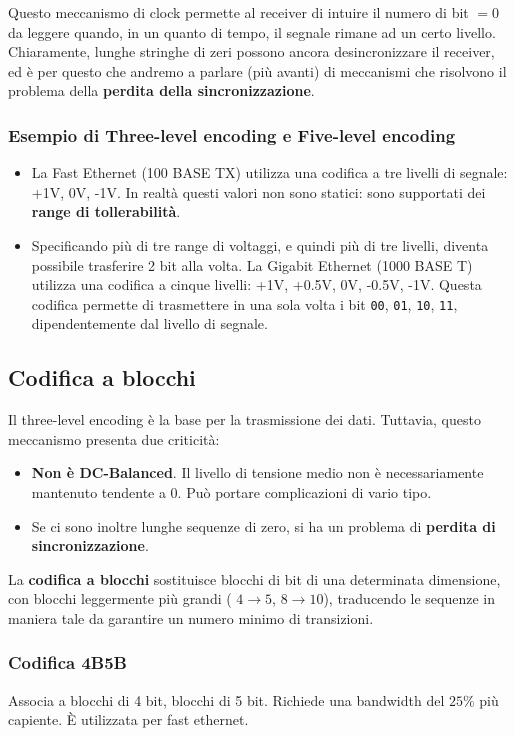Questo meccanismo di clock permette al receiver di intuire il numero di bit $=0$ da leggere quando, in un quanto di tempo, il segnale rimane ad un certo livello. Chiaramente, lunghe stringhe di zeri possono ancora desincronizzare il receiver, ed è per questo che andremo a parlare (più avanti) di meccanismi che risolvono il problema della \textbf{perdita della sincronizzazione}.


\subsubsection{Esempio di Three-level encoding e Five-level encoding}
\begin{itemize}
	\item La Fast Ethernet (100 BASE TX) utilizza una codifica a tre livelli di segnale: +1V, 0V, -1V. In realtà questi valori non sono statici: sono supportati dei \textbf{range di tollerabilità}.
	\item Specificando più di tre range di voltaggi, e quindi più di tre livelli, diventa possibile trasferire 2 bit alla volta.
	La Gigabit Ethernet (1000 BASE T) utilizza una codifica a cinque livelli: +1V, +0.5V, 0V, -0.5V, -1V. Questa codifica permette di trasmettere in una sola volta i bit \verb|00|, \verb|01|, \verb|10|, \verb|11|, dipendentemente dal livello di segnale.
\end{itemize}

\newpage

\subsection{Codifica a blocchi}
Il three-level encoding è la base per la trasmissione dei dati. Tuttavia, questo meccanismo presenta due criticità:
\begin{itemize}
	\item \textbf{Non è DC-Balanced}. Il livello di tensione medio non è necessariamente mantenuto tendente a 0. Può portare complicazioni di vario tipo.
	\item Se ci sono inoltre lunghe sequenze di zero, si ha un problema di \textbf{perdita di sincronizzazione}.
\end{itemize}
La \textbf{codifica a blocchi} sostituisce blocchi di bit di una determinata dimensione, con blocchi leggermente più grandi ( $4\to5$, $8\to 10$), traducendo le sequenze in maniera tale da garantire un numero minimo di transizioni.

\subsubsection{Codifica 4B5B}
Associa a blocchi di 4 bit, blocchi di 5 bit. Richiede una bandwidth del $25\%$ più capiente. È utilizzata per fast ethernet.

